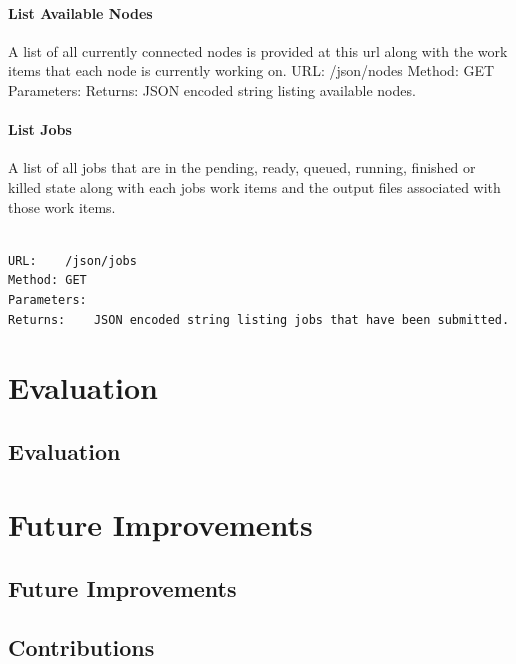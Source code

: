 \subsection{List Available Nodes}
\label{listavailablenodes}

A list of all currently connected nodes is provided at this url along with the work items that each node is currently working on.
 URL: \slash json\slash nodes
 Method: GET
 Parameters:
 Returns: JSON encoded string listing available nodes.

\subsection{List Jobs}
\label{listjobs}

A list of all jobs that are in the pending, ready, queued, running, finished or killed state along with each jobs work items and the output files associated with those work items.

\begin{adjustwidth}{2.5em}{2.5em}
\begin{verbatim}

URL:    /json/jobs
Method: GET
Parameters:
Returns:    JSON encoded string listing jobs that have been submitted.

\end{verbatim}
\end{adjustwidth}

\part{Evaluation}
\label{evaluation}

\chapter{Evaluation}
\label{evaluation}

\part{Future Improvements}
\label{futureimprovements}

\chapter{Future Improvements}
\label{futureimprovements}

 \clearpage \chapter{Contributions}
\label{contributions}

